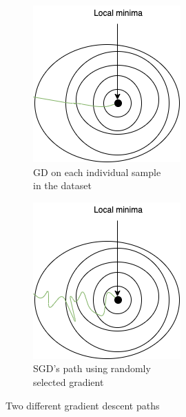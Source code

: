 \begin{figure}[h]
\centering
\begin{subfigure}{0.4\textwidth}
\centering
\includegraphics[scale=0.4]{latex/imgs/GDsmooth.png}
\caption{GD on each individual sample\\  in the dataset}
\end{subfigure}
\begin{subfigure}{0.4\textwidth}
\centering
\includegraphics[scale=0.4]{latex/imgs/SGDpath.png}
\caption{SGD's path using randomly \\ selected gradient}
\end{subfigure}
\caption{Two different gradient descent paths}
\label{fig:image2}
\end{figure}